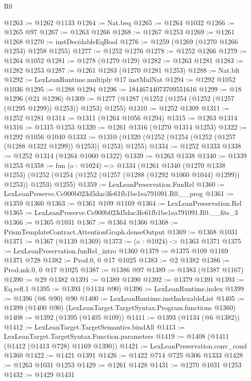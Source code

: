 \begin{lexlean}{R0}
\begin{coremodule}
@1263 := @1262 @1133
@1264 := Nat.beq
@1265 := @1264 @1032
@1266 := @1265 @97
@1267 := @1263 @1266
@1268 := @1267 @1253
@1269 := @1261 @1268
@1270 := instDecidableEqBool
@1276 := @1259 (@1269 (@1270 @1266 @1253) @1258 @1255)
@1277 := @1252 @1276
@1278 := @1252 @1266
@1279 := @1264 @1052
@1281 := @1278 (@1279 @129)
@1282 := @1263 @1281
@1283 := @1282 @1253
@1287 := @1261 @1283 (@1270 @1281 @1253)
@1288 := Nat.blt
@1292 := LexLeanRuntime.multiply @17 instMulNat
@1294 := @1292 @1052 @1036
@1295 := @1288 @1294
@1296 := 18446744073709551616
@1299 := @18 @1296 (@21 @1296)
@1309 := @1277 (@1287 (@1252 (@1254 (@1252 (@1257 (@1295 @1299)) @1253)) @1253) @1255)
@1310 := @1252 @1309
@1311 := @1252 @1281
@1314 := @1311 (@1264 @1056 @1294)
@1315 := @1263 @1314
@1316 := @1315 @1253
@1320 := @1261 @1316 (@1270 @1314 @1253)
@1322 := @1292 @1056 @1040
@1333 := @1310 (@1320 (@1252 (@1254 (@1252 (@1257 (@1288 @1322 @1299)) @1253)) @1253) @1255)
@1334 := @1252 @1333
@1338 := @1252 @1314 (@1264 @1060 @1322)
@1339 := @1263 @1338
@1340 := @1339 @1253
@1358 := fun (o : @1024) =>
  @1334
    (@1261
      @1340
      (@1270 @1338 @1253)
      (@1252 (@1254 (@1252 (@1257 (@1288 (@1292 @1060 @1044) @1299)) @1253)) @1253)
      @1255)
@1359 := LexLeanPreservation.FunRel
@1360 := LexLeanPreserve.Ce900b023d5dac3fe61fb1be1ea791091.R0.__prog
@1361 := @1359 @1360
@1363 := @1361 @109 @1169
@1364 := LexLeanPreservation.Rel
@1365 := LexLeanPreserve.Ce900b023d5dac3fe61fb1be1ea791091.R0.__fits_3
@1366 := @1365 @1031
@1367 := @1364 @1366
@1368 := PrismTemplateContract.AttentionGraph.denseOutput
@1369 := @1368 @1031
@1371 := @1367 (@1139 @1369)
@1373 := (o : @1024) -> @1363 @1371
@1375 := LexLeanPreservation.funRel_intro @1360
@1379 := @1375 @109 @1169 @1371 @728
@1382 := Prod.{0, 0} @17 @1025
@1383 := @2 @1382
@1386 := Prod.mk.{0, 0} @17 @1025
@1387 := @1386 @97
@1389 := @1383 (@1387 @1167)
@1390 := @29 @1382
@1391 := @1389 @1390
@1392 := @1379 @1391
@1393 := Eq.refl.{1}
@1395 := @1393 (@1134 @90)
@1396 := LexLeanRuntime.index
@1399 := @1396 (@6 @90) @90
@1400 := LexLeanRuntime.instIndexableList
@1405 := @1399 (@1400 @90) (LexLeanTarget.TargetSyntax.Program.functions @1360)
@1408 := @1392 (@1395 (@1405 @109))
@1411 := @1393 (@1134 (@6 @1382))
@1412 := LexLeanTarget.TargetSemantics.bindAll
@1413 := LexLeanTarget.TargetSyntax.Function.parameters
@1419 := @1408 (@1411 (@1412 (@1413 @728) @1169 @1390))
@1421 := LexLeanPreservation.conv_cond @1360
@1422 := @1421 @1391
@1426 := @1422 @714 @725 @306 @1333
@1428 := @1263 @1031 @1253
@1429 := @1261 @1428
@1431 := @1270 @1031 @1253
@1432 := @1429 @1431

\end{coremodule}
\end{lexlean}
